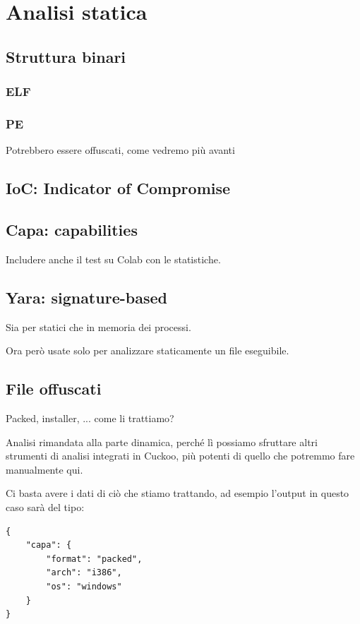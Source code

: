 \chapter{Analisi statica}

\section{Struttura binari}

\subsection{ELF}

\subsection{PE}
Potrebbero essere offuscati, come vedremo più avanti

\section{IoC: Indicator of Compromise}

\section{Capa: capabilities}
Includere anche il test su Colab con le statistiche.

\section{Yara: signature-based}
Sia per statici che in memoria dei processi.

Ora però usate solo per analizzare staticamente un file eseguibile.

\section{File offuscati}
Packed, installer, ... come li trattiamo?

Analisi rimandata alla parte dinamica, perché lì possiamo sfruttare altri strumenti di analisi integrati in Cuckoo, più potenti di quello che potremmo fare manualmente qui.

Ci basta avere i dati di ciò che stiamo trattando, ad esempio l'output in questo caso sarà del tipo:
\begin{code}
\label{code:json_capa_packed}
\begin{verbatim}
{
    "capa": {
        "format": "packed",
        "arch": "i386",
        "os": "windows"
    }
}
\end{verbatim}
\end{code}

